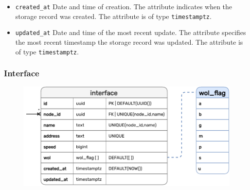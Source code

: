 \begin{itemize}
  \item \texttt{created\_at}
    \newline
    Date and time of creation.
    \newline
    The attribute indicates when the storage record was created.
    \newline
    The attribute is of type \texttt{timestamptz}.

  \item \texttt{updated\_at}
    \newline
    Date and time of the most recent update.
    \newline
    The attribute specifies the most recent timestamp the storage record was updated.
    \newline
    The attribute is of type \texttt{timestamptz}.
\end{itemize}

\subsubsection{Interface}
\label{subsubsec:implementation_server_database_interface}

\begin{figure}[htbp]
  \centering
  \includegraphics[width=.75\textwidth]{images/implementation/erm_interface.pdf}
\end{figure}


